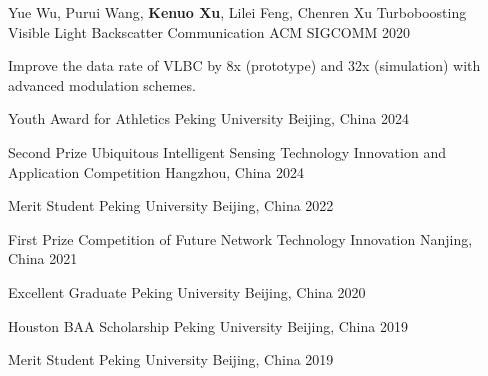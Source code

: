 \documentclass[11pt, a4paper]{awesome-cv}
\begin{document}
\begin{cventries}
	\cventry
	{Yue Wu, Purui Wang, \textbf{Kenuo Xu}, Lilei Feng, Chenren Xu}
	{Turboboosting Visible Light Backscatter Communication}
	{ACM SIGCOMM}
	{2020}
	{
		\begin{cvitems} %
			\item {Improve the data rate of VLBC by 8x (prototype) and 32x (simulation) with advanced modulation schemes.}
		\end{cvitems}
	}
	
	
\end{cventries}


\begin{cvhonors}
		
	\cvhonor
	{Youth Award for Athletics} %
	{Peking University} %
	{Beijing, China} %
	{2024} %
	
	\cvhonor
	{Second Prize} %
	{Ubiquitous Intelligent Sensing Technology Innovation and Application Competition} %
	{Hangzhou, China} %
	{2024} %
		
	\cvhonor
	{Merit Student} %
	{Peking University} %
	{Beijing, China} %
	{2022} %
	
	\cvhonor
	{First Prize} %
	{Competition of Future Network Technology Innovation} %
	{Nanjing, China} %
	{2021} %
	
	\cvhonor
	{Excellent Graduate} %
	{Peking University} %
	{Beijing, China} %
	{2020} %
	
	\cvhonor
	{Houston BAA Scholarship} %
	{Peking University} %
	{Beijing, China} %
	{2019} %
	
	\cvhonor
	{Merit Student} %
	{Peking University} %
	{Beijing, China} %
	{2019} %

\end{cvhonors}
\end{document}
